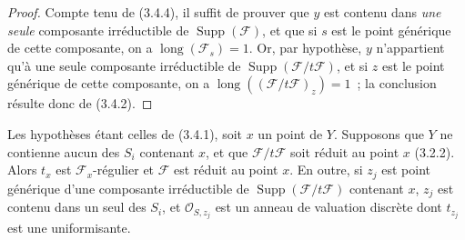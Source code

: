 \begin{proof}
Compte tenu de (3.4.4), il suffit de prouver que $y$ est contenu dans \emph{une
seule} composante irréductible de $\operatorname{Supp}(\mathcal F)$, et
que si $s$ est le point générique de cette composante, on a
$\operatorname{long}(\mathcal F_s)=1$. Or, par hypothèse, $y$ n'appartient
qu'à une seule composante irréductible de
$\operatorname{Supp}(\mathcal F/t\mathcal F)$, et si $z$ est le point
générique de cette composante, on a
$\operatorname{long}((\mathcal F/t\mathcal F)_z)=1$~; la conclusion résulte
donc de (3.4.2).
\end{proof}

\begin{proposition}[3.4.6]
\label{IV.2.3.4.6-fr}
Les hypothèses étant celles de \textup{(3.4.1)}, soit $x$ un point de $Y$. Supposons
que $Y$ ne contienne aucun des $S_i$ contenant $x$, et que
$\mathcal F/t\mathcal F$ soit réduit au point $x$ \textup{(3.2.2)}. Alors $t_x$ est
$\mathcal F_x$-régulier et $\mathcal F$ est réduit au point $x$. En outre, si
$z_j$ est point générique d'une composante irréductible de
$\operatorname{Supp}(\mathcal F/t\mathcal F)$ contenant $x$, $z_j$ est
contenu dans un seul des $S_i$, et $\mathcal O_{S,z_j}$ est un anneau de
valuation discrète dont $t_{z_j}$ est une uniformisante.
\end{proposition}


